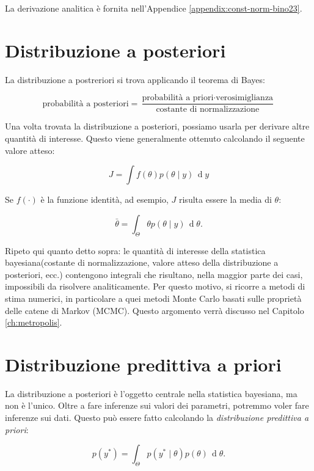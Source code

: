 \documentclass[
]{book}
\theoremstyle{definition}
\theoremstyle{definition}
\theoremstyle{definition}
\theoremstyle{definition}
\theoremstyle{remark}
\begin{document}
La derivazione analitica è fornita nell'Appendice \ref{appendix:const-norm-bino23}.

\hypertarget{distribuzione-a-posteriori}{%
\section{Distribuzione a posteriori}\label{distribuzione-a-posteriori}}

La distribuzione a postreriori si trova applicando il teorema di Bayes:

\[
\text{probabilità a posteriori} = \frac{\text{probabilità a priori} \cdot \text{verosimiglianza}}{\text{costante di normalizzazione}}
\]

Una volta trovata la distribuzione a posteriori, possiamo usarla per derivare altre quantità di interesse. Questo viene generalmente ottenuto calcolando il seguente valore atteso:

\[
J = \int f(\theta) p(\theta \mid y) \,\operatorname {d}\!y
\]

Se \(f(\cdot)\) è la funzione identità, ad esempio, \(J\) risulta essere la media di \(\theta\):

\[
\bar{\theta} = \int_{\Theta} \theta p(\theta \mid y) \,\operatorname {d}\!\theta .
\]

Ripeto qui quanto detto sopra: le quantità di interesse della statistica bayesiana(costante di normalizzazione, valore atteso della distribuzione a posteriori, ecc.) contengono integrali che risultano, nella maggior parte dei casi, impossibili da risolvere analiticamente. Per questo motivo, si ricorre a metodi di stima numerici, in particolare a quei metodi Monte Carlo basati sulle proprietà delle catene di Markov (MCMC). Questo argomento verrà discusso nel Capitolo \ref{ch:metropolis}.

\hypertarget{distribuzione-predittiva-a-priori}{%
\section{Distribuzione predittiva a priori}\label{distribuzione-predittiva-a-priori}}

La distribuzione a posteriori è l'oggetto centrale nella statistica bayesiana, ma non è l'unico. Oltre a fare inferenze sui valori dei parametri, potremmo voler fare inferenze sui dati. Questo può essere fatto calcolando la \emph{distribuzione predittiva a priori}:

\begin{equation}
p(y^*) = \int_\Theta p(y^* \mid \theta) p(\theta) \,\operatorname {d}\!\theta .
\label{eq:prior-pred-distr}
\end{equation}
\end{document}
